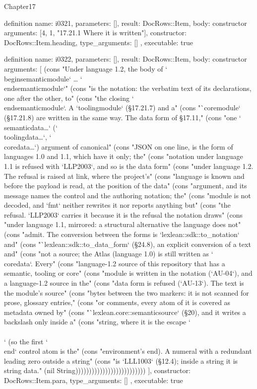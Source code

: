 \begin{lexlean}{Chapter17}
\begin{semanticmodule}
definition{
  name: i0321,
  parameters: [],
  result: DocRows::Item,
  body: constructor{
    arguments: [4, 1, "17.21.1 Where it is written"],
    constructor: DocRows::Item.heading,
    type_arguments: []
  },
  executable: true
}

definition{
  name: i0322,
  parameters: [],
  result: DocRows::Item,
  body: constructor{
    arguments: [
      (cons "Under language 1.2, the body of `\\begin{semanticmodule}` … `\\end{semanticmodule}`" (cons "is the notation: the verbatim text of its declarations, one after the other, to" (cons "the closing `\\end{semanticmodule}`. A `toolingmodule` (§17.21.7) and a" (cons "`coremodule` (§17.21.8) are written in the same way. The data form of §17.11," (cons "one `\\semanticdata{…}` (`\\toolingdata{…}`, `\\coredata{…}`) argument of canonical" (cons "JSON on one line, is the form of languages 1.0 and 1.1, which have it only; the" (cons "notation under language 1.1 is refused with `LLP2003`, and so is the data form" (cons "under language 1.2. The refusal is raised at link, where the project's" (cons "language is known and before the payload is read, at the position of the data" (cons "argument, and its message names the control and the authoring notation; the" (cons "module is not decoded, and `fmt` neither rewrites it nor reports anything but" (cons "the refusal. `LLP2003` carries it because it is the refusal the notation draws" (cons "under language 1.1, mirrored: a structural alternative the language does not" (cons "admit. The conversion between the forms is `lexlean::sdk::to_notation` and" (cons "`lexlean::sdk::to_data_form` (§24.8), an explicit conversion of a text and" (cons "not a source; the Atlas (language 1.0) is still written as `\\coredata`. Every" (cons "language-1.2 source of this repository that has a semantic, tooling or core" (cons "module is written in the notation (`AU-04`), and a language-1.2 source in the" (cons "data form is refused (`AU-13`). The text is the module's source" (cons "bytes between the two markers: it is not scanned for prose, glossary entries," (cons "or comments, every atom of it is covered as metadata owned by" (cons "`lexlean.core::semanticsource` (§20), and it writes a backslash only inside a" (cons "string, where it is the escape `\\\\` (so the first `\\end` control atom is the" (cons "environment's end). A numeral with a redundant leading zero outside a string" (cons "is `LLL1003` (§12.4); inside a string it is string data." (nil String))))))))))))))))))))))))))
    ],
    constructor: DocRows::Item.para,
    type_arguments: []
  },
  executable: true
}


\end{semanticmodule}
\end{lexlean}
